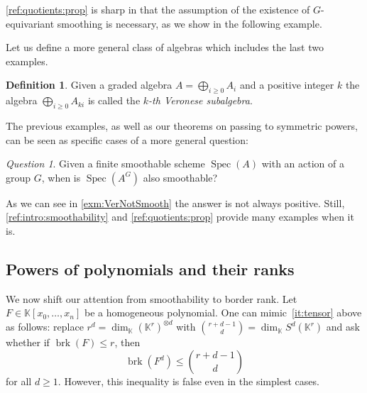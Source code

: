 \documentclass[a4paper,11pt,reqno]{amsart}
\newcommand{\bbK}{\mathbb{K}}
\DeclareMathOperator{\brk}{brk}
\DeclareMathOperator{\HF}{HF}
\DeclareMathOperator{\Spec}{Spec}
\numberwithin{equation}{section}
\theoremstyle{definition}
\newtheorem{defn}[equation]{Definition}
\theoremstyle{plain}
\theoremstyle{remark}
\newtheorem{exam}[defn]{Example}
\newtheorem{question}[defn]{Question}
\newcommand{\goodquotient}{\mathbin{
  \mathchoice{\left/\mkern-6mu\right/}%
    {/\mkern-5mu/}%
    {/\mkern-5mu/}%
    {/\mkern-5mu/}}}%
\begin{document}
\autoref{ref:quotients:prop} is sharp in that the
assumption of the existence of $G$-equivariant smoothing is
necessary, as we {show} in the following example.


Let us define a more general class of algebras which includes the last two
examples.
\begin{defn}
Given a graded algebra $A=\bigoplus_{i\geq 0} A_i$ and a positive integer $k$
the algebra $\bigoplus_{i\geq 0} A_{ki}$ is called the \emph{$k$-th Veronese subalgebra}.
\end{defn}

The previous examples, as well as our theorems on passing to symmetric powers,
can be seen as specific cases of a more general question:
\begin{question}
Given a finite smoothable scheme $\Spec(A)$ with an action of a group $G$,
when is $\Spec(A^G)$ also smoothable?
\end{question}
As we can see in \autoref{exm:VerNotSmooth} the answer is not always positive. Still, \autoref{ref:intro:smoothability} and \autoref{ref:quotients:prop} provide many examples when it is.

\subsection{Powers of polynomials and their ranks}

We now shift {our} attention from smoothability to border rank.
    Let $F\in \bbK[x_0, \ldots ,x_n]$ be a homogeneous polynomial.
    {One can mimic~\ref{it:tensor} above as follows: replace $r^d = \dim_{\bbK} (\bbK^r)^{\otimes d}$ with $\binom{r+d-1}{d} = \dim_{\bbK} S^d(\bbK^r)$ and ask whether} if $\brk(F) {\leq} r$, then \[\brk(F^d) \leq
    \binom{r+d-1}{d}\] for all $d\geq 1$. {However, this inequality} is false even in the {simplest} cases.
\end{document}

